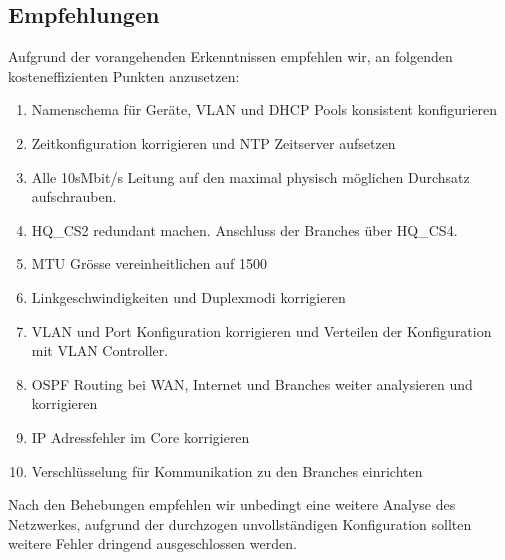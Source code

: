 \subsection{Empfehlungen}
\label{sec:recommedations}
Aufgrund der vorangehenden Erkenntnissen empfehlen wir, an folgenden kosteneffizienten Punkten anzusetzen:
\begin{enumerate}
	\item Namenschema für Geräte, VLAN und DHCP Pools konsistent konfigurieren
	\item Zeitkonfiguration korrigieren und NTP Zeitserver aufsetzen
	\item Alle 10sMbit/s Leitung auf den maximal physisch möglichen Durchsatz aufschrauben. 
	\item HQ\_CS2 redundant machen. Anschluss der Branches über HQ\_CS4.
	\item MTU Grösse vereinheitlichen auf 1500
	\item Linkgeschwindigkeiten und Duplexmodi korrigieren 
	\item VLAN und Port Konfiguration korrigieren und Verteilen der Konfiguration mit VLAN Controller.
	\item OSPF Routing bei WAN, Internet und Branches weiter analysieren und korrigieren
	\item IP Adressfehler im Core korrigieren
	\item Verschlüsselung für Kommunikation zu den Branches einrichten
\end{enumerate}
Nach den Behebungen empfehlen wir unbedingt eine weitere Analyse des Netzwerkes, aufgrund der durchzogen unvollständigen Konfiguration sollten weitere Fehler dringend ausgeschlossen werden.

